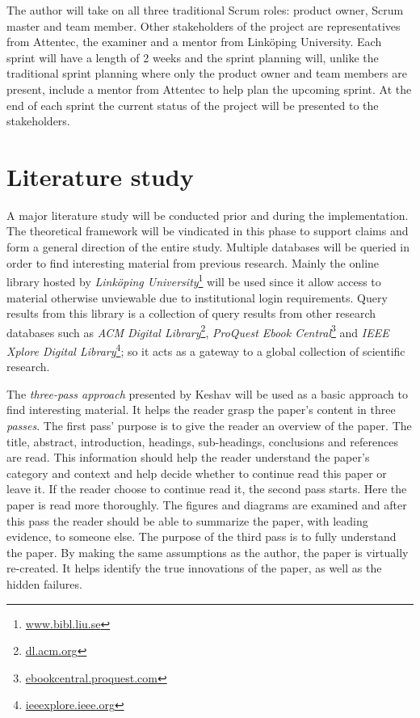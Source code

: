 The author will take on all three traditional Scrum roles: product owner, Scrum
master and team member. Other stakeholders of the project are representatives
from Attentec, the examiner and a mentor from Linköping University. Each sprint
will have a length of 2 weeks and the sprint planning will, unlike the
traditional sprint planning \cite{sims2012scrum} where only the product owner
and team members are present, include a mentor from Attentec to help plan the
upcoming sprint. At the end of each sprint the current status of the project
will be presented to the stakeholders.

\section{Literature study}

A major literature study will be conducted prior and during the implementation.
The theoretical framework will be vindicated in this phase to support claims
and form a general direction of the entire study. Multiple databases will be
queried in order to find interesting material from previous research. Mainly
the online library hosted by \textit{Linköping
University}\footnote{\url{www.bibl.liu.se}} will be used since it allow access
to material otherwise unviewable due to institutional login requirements. Query
results from this library is a collection of query results from other research
databases such as \textit{ACM Digital Library}\footnote{\url{dl.acm.org}},
\textit{ProQuest Ebook Central}\footnote{\url{ebookcentral.proquest.com}} and
\textit{IEEE Xplore Digital Library}\footnote{\url{ieeexplore.ieee.org}}; so it
acts as a gateway to a global collection of scientific research.

The \textit{three-pass approach} presented by Keshav \cite{keshav2007read} will
be used as a basic approach to find interesting material. It helps the reader
grasp the paper's content in three \textit{passes}. The first pass' purpose is
to give the reader an overview of the paper. The title, abstract, introduction,
headings, sub-headings, conclusions and references are read. This information
should help the reader understand the paper's category and context and help
decide whether to continue read this paper or leave it. If the reader choose to
continue read it, the second pass starts. Here the paper is read more
thoroughly. The figures and diagrams are examined and after this pass the
reader should be able to summarize the paper, with leading evidence, to someone
else. The purpose of the third pass is to fully understand the paper. By making
the same assumptions as the author, the paper is virtually re-created. It helps
identify the true innovations of the paper, as well as the hidden failures.

